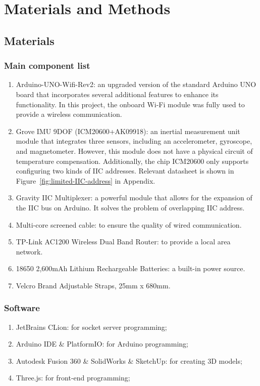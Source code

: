 \chapter{Materials and Methods}


\section{Materials}


\subsection{Main component list}
\begin{enumerate}
	\item   Arduino-UNO-Wifi-Rev2: an upgraded version of the standard Arduino UNO board that incorporates several additional features to enhance its functionality.
	In this project, the onboard Wi-Fi module was fully used to provide a wireless communication.
	\item   Grove IMU 9DOF (ICM20600+AK09918): an inertial measurement unit module that integrates three sensors, including an accelerometer, gyroscope, and magnetometer.
	However, this module does not have a physical circuit of temperature compensation.
	Additionally, the chip ICM20600 only supports configuring two kinds of IIC addresses.
	Relevant datasheet is shown in Figure~\ref{fig:limited-IIC-address} in Appendix.
	\item   Gravity IIC Multiplexer: a powerful module that allows for the expansion of the IIC bus on Arduino.
	It solves the problem of overlapping IIC address.
	\item   Multi-core screened cable: to ensure the quality of wired communication.
	\item   TP-Link AC1200 Wireless Dual Band Router: to provide a local area network.
	\item   18650 2,600mAh Lithium Rechargeable Batteries: a built-in power source.
	\item   Velcro Brand Adjustable Straps, 25mm x 680mm.
\end{enumerate}


\subsection{Software}
\begin{enumerate}
	\item JetBrains CLion: for socket server programming;
	\item Arduino IDE \& PlatformIO: for Arduino programming;
	\item Autodesk Fusion 360 \& SolidWorks \& SketchUp: for creating 3D models;
	\item Three.js: for front-end programming;
\end{enumerate}


